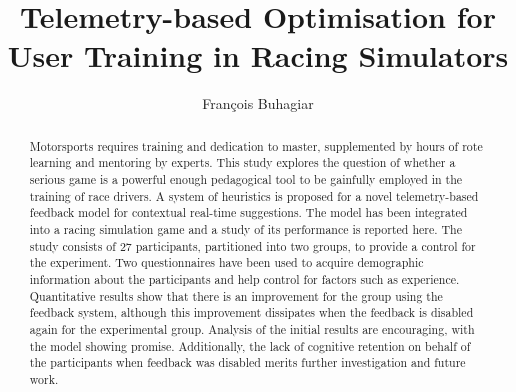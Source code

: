 \documentclass{sig-alternate}
\begin{document}
\title{Telemetry-based Optimisation for User Training in Racing Simulators}

\author{
	\alignauthor
	Fran\c{c}ois Buhagiar\\
}

\maketitle
\begin{abstract}

Motorsports requires training and dedication to master, supplemented by hours of rote learning and mentoring by experts. This study explores the question of whether a serious game is a powerful enough pedagogical tool to be gainfully employed in the training of race drivers. A system of heuristics is proposed for a novel telemetry-based feedback model for contextual real-time suggestions. The model has been integrated into a racing simulation game and a study of its performance is reported here. The study consists of 27 participants, partitioned into two groups, to provide a control for the experiment. Two questionnaires have been used to acquire demographic information about the participants and help control for factors such as experience. Quantitative results show that there is an improvement for the group using the feedback system, although this improvement dissipates when the feedback is disabled again for the experimental group. Analysis of the initial results are encouraging, with the model showing promise. Additionally, the lack of cognitive retention on behalf of the participants when feedback was disabled merits further investigation and future work.

\end{abstract}


\def \methodname {TeAR\xspace}
\def \methodnamefull {Telemetry Assisted Racing\xspace}
\end{document}
